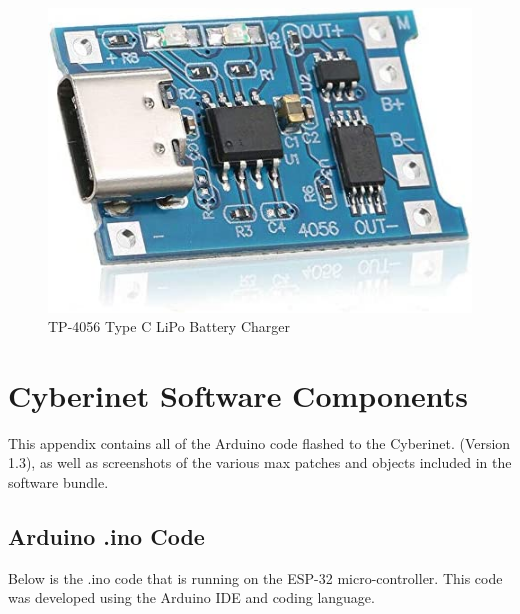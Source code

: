 \begin{center}
    \begin{figure}
        \centering
        \includegraphics[scale=0.3]{diagrams/oem/4056.jpg}
        \caption{TP-4056 Type C LiPo Battery Charger}
        \label{fig4055}
    \end{figure}
\end{center}




\chapter{Cyberinet Software Components}
This appendix contains all of the Arduino code flashed to the Cyberinet. (Version 1.3), as well as screenshots of the various max patches and objects included in the software bundle.

\section{Arduino .ino Code}

Below is the .ino code that is running on the ESP-32 micro-controller. This code was developed using the Arduino IDE and coding language.

